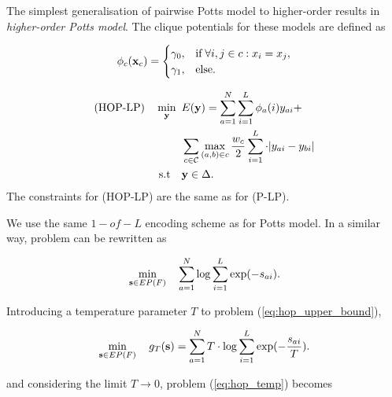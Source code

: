 The simplest generalisation of pairwise Potts model to higher-order results in
\textit{higher-order Potts model}. The clique potentials for these models are
defined as

\begin{equation}
  \phi_c({\bf x}_c) = 
  \begin{cases}
    \gamma_0, &{\text{if}} \; \forall i, j \in c: x_i = x_j, \\
    \gamma_1, &{\text{else}}. 
  \end{cases} 
\end{equation}

\begin{align}
    \text{(HOP-LP)} \quad \min_{\bf y} \enskip & E({\bf y}) =  \sum_{a = 1}^N
    \sum_{i = 1}^L \phi_a(i)y_{ai} + \nonumber\\
    &\sum_{c \in {\mathcal C}} \max_{(a, b) \in c} \frac{w_c}{2} \sum_{i = 1}^L \cdot |y_{ai} - y_{bi}| \nonumber\\
    \text{s.t} \quad &{\bf y} \in \Delta.
\label{eq:hop-lp}
\end{align}
The constraints for (HOP-LP) are the same as for (P-LP).

 We use the same $1-of-L$ encoding
scheme as for Potts model. In a similar way, problem can be rewritten as

\begin{equation}
\min_{{\bf s} \in EP(F)} \quad \sum_{a = 1}^{N} \log \sum_{i = 1}^L \exp(-s_{ai}).
\label{eq:hop_upper_bound}
\end{equation}

Introducing a temperature parameter $T$ to problem (\ref{eq:hop_upper_bound}), 

\begin{equation}
    \min_{{\bf s} \in EP(F)} \quad g_T ({\bf s}) = \sum_{a = 1}^{N} T \cdot \log \sum_{i = 1}^L \exp(-\frac{s_{ai}}{T}).
\label{eq:hop_temp}
\end{equation}

and considering the limit $T \to 0$, problem (\ref{eq:hop_temp}) becomes

